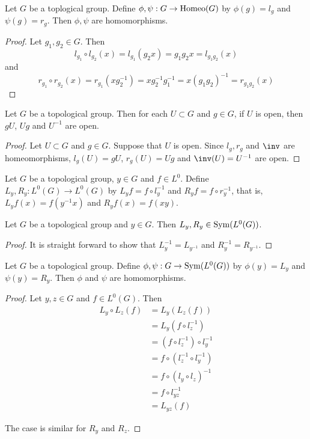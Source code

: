 \documentclass{book}
\begin{document}
	\begin{ex}  
	Let $G$ be a toplogical group. Define $\phi, \psi:G \rightarrow \operatorname{Homeo}(G)$ by $\phi(g) = l_g$ and $\psi(g) = r_g$. Then $\phi, \psi$ are homomorphisms.
	\end{ex}
	
	\begin{proof}
	Let $g_1, g_2 \in G$. Then $$l_{g_1} \circ l_{g_2}(x) = l_{g_1}(g_2 x) = g_1 g_2 x= l_{g_1 g_2}(x)$$ and $$r_{g_1} \circ r_{g_2} (x) = r_{g_1}(x g_2^{-1})= xg_2^{-1}g_1^{-1} = x(g_1g_2)^{-1} = r_{g_1g_2}(x)$$ 
	\end{proof}
	
	\begin{ex}  
		Let $G$ be a topological group. Then for each $U \subset G$ and $g \in G$, if $U$ is open, then $gU$, $Ug$ and $U^{-1}$ are open. 
	\end{ex}
	\begin{proof}
		Let $U \subset G$ and $g \in G$. Suppose that $U$ is open. Since $l_g, r_g$ and $\inv$ are homeomorphisms, $l_g(U) = gU$, $r_g(U) = Ug$ and $\inv(U) = U^{-1}$ are open. 
	\end{proof}
	
	\begin{defn}  
		Let $G$ be a topological group, $y \in G$ and $f \in L^0$.  Define $L_y, R_y: L^0(G) \rightarrow L^0(G)$ by $L_y f = f \circ l_y^{-1}$ and $R_y f = f \circ r_y^{-1}$, that is, $L_yf(x) = f(y^{-1}x)$ and $R_yf(x) = f(xy)$.
	\end{defn}
	
	\begin{ex}  
	Let $G$ be a topological group and $y \in G$. Then $L_y, R_y \in \operatorname{Sym}(L^0(G))$. 
	\end{ex}
	
	\begin{proof}
	It is straight forward to show that $L_y^{-1} = L_{y^{-1}}$ and $R_y^{-1} = R_{y^{-1}}$. 
	\end{proof}
	
	\begin{ex}  
	Let $G$ be a topological group. Define $\phi, \psi: G \rightarrow \operatorname{Sym}(L^0(G))$ by $\phi(y) = L_y$ and $\psi(y) = R_y$. Then $\phi$ and $\psi$ are homomorphisms.
	\end{ex}

	\begin{proof}
		Let $y,z \in G$ and $f \in L^0(G)$. Then 
		\begin{align*}
			L_y \circ L_z(f)
			& = L_y (L_z (f))  \\
			& = L_y (f \circ l_z^{-1})  \\
			& = (f \circ l_z^{-1}) \circ l_y^{-1} \\
			&= f \circ (l_z^{-1} \circ l_y^{-1}) \\
			& = f \circ (l_y \circ l_z)^{-1}  \\
			& = f \circ l_{yz}^{-1} \\
			&= L_{yz} (f)
		\end{align*}
		
		The case is similar for $R_y$ and $ R_z$.
	\end{proof}
	
\end{document}
